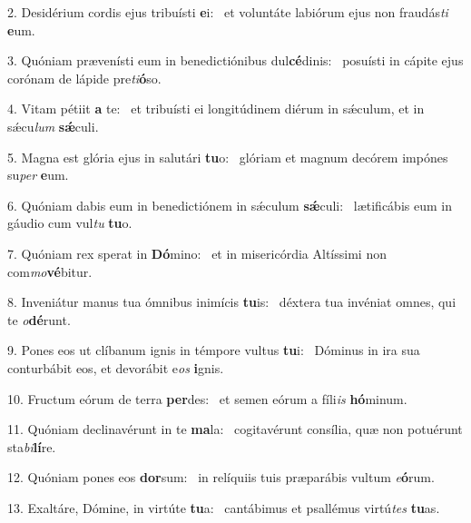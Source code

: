 2. Desidérium cordis ejus tribuísti \textbf{e}i: \ast\  et voluntáte labiórum ejus non fraudás\textit{ti} \textbf{e}um.\

3. Quóniam prævenísti eum in benedictiónibus dul\textbf{cé}dinis: \ast\  posuísti in cápite ejus corónam de lápide pre\textit{ti}\textbf{ó}so.\

4. Vitam pétiit \textbf{a} te: \ast\  et tribuísti ei longitúdinem diérum in sǽculum, et in sǽcu\textit{lum} \textbf{sǽ}culi.\

5. Magna est glória ejus in salutári \textbf{tu}o: \ast\  glóriam et magnum decórem impónes su\textit{per} \textbf{e}um.\

6. Quóniam dabis eum in benedictiónem in sǽculum \textbf{sǽ}culi: \ast\  lætificábis eum in gáudio cum vul\textit{tu} \textbf{tu}o.\

7. Quóniam rex sperat in \textbf{Dó}mino: \ast\  et in misericórdia Altíssimi non com\textit{mo}\textbf{vé}bitur.\

8. Inveniátur manus tua ómnibus inimícis \textbf{tu}is: \ast\  déxtera tua invéniat omnes, qui te \textit{o}\textbf{dé}runt.\

9. Pones eos ut clíbanum ignis in témpore vultus \textbf{tu}i: \ast\  Dóminus in ira sua conturbábit eos, et devorábit e\textit{os} \textbf{i}gnis.\

10. Fructum eórum de terra \textbf{per}des: \ast\  et semen eórum a fíli\textit{is} \textbf{hó}minum.\

11. Quóniam declinavérunt in te \textbf{ma}la: \ast\  cogitavérunt consília, quæ non potuérunt sta\textit{bi}\textbf{lí}re.\

12. Quóniam pones eos \textbf{dor}sum: \ast\  in relíquiis tuis præparábis vultum \textit{e}\textbf{ó}rum.\

13. Exaltáre, Dómine, in virtúte \textbf{tu}a: \ast\  cantábimus et psallémus virtú\textit{tes} \textbf{tu}as.\

